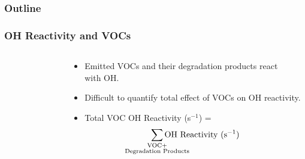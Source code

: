 \begin{frame}
    \frametitle{Outline} 
    \begin{flushleft}
        \tableofcontents[currentsection]
    \end{flushleft}
\end{frame} 

\begin{frame}
    \frametitle{OH Reactivity and VOCs}
    \vspace{-1cm}

    \begin{columns}[onlytextwidth]
        \begin{column}{0.45\textwidth}
            \begin{figure}
                \centering
                \def\svgwidth{\columnwidth}
                 
            \end{figure}
        \end{column}%
        \begin{column}{0.55\textwidth}
            \begin{center}
                \begin{itemize}
                    \item Emitted VOCs and their degradation products react \\with OH. \vspace{3mm}
                    \item Difficult to quantify total effect of VOCs on OH reactivity. \vspace{3mm}
                    \item Total VOC OH Reactivity (s$^{-1}$) = \vspace{-1.1cm} $$\sum_{\mathclap{\substack{\text{VOC} + \\ \text{Degradation Products}}}}{\text{OH Reactivity (s$^{-1}$)}}$$
                \end{itemize}
            \end{center}
        \end{column}
    \end{columns}
\end{frame}

